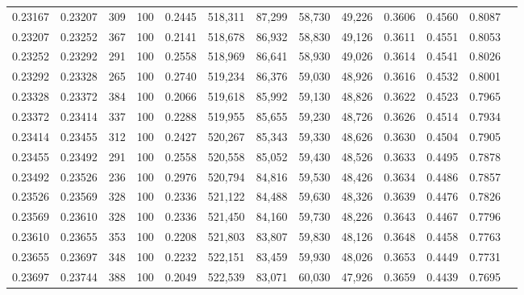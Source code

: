 \begin{tabular}{rrrrrrrrrrrrr}
0.23167 & 0.23207 &   309 & 100 &                                     0.2445 & 518,311 &  87,299 &  58,730 &  49,226 & 0.3606 & 0.4560 & 0.8087 \\
0.23207 & 0.23252 &   367 & 100 &                                     0.2141 & 518,678 &  86,932 &  58,830 &  49,126 & 0.3611 & 0.4551 & 0.8053 \\
0.23252 & 0.23292 &   291 & 100 &                                     0.2558 & 518,969 &  86,641 &  58,930 &  49,026 & 0.3614 & 0.4541 & 0.8026 \\
0.23292 & 0.23328 &   265 & 100 &                                     0.2740 & 519,234 &  86,376 &  59,030 &  48,926 & 0.3616 & 0.4532 & 0.8001 \\
0.23328 & 0.23372 &   384 & 100 &                                     0.2066 & 519,618 &  85,992 &  59,130 &  48,826 & 0.3622 & 0.4523 & 0.7965 \\
0.23372 & 0.23414 &   337 & 100 &                                     0.2288 & 519,955 &  85,655 &  59,230 &  48,726 & 0.3626 & 0.4514 & 0.7934 \\
0.23414 & 0.23455 &   312 & 100 &                                     0.2427 & 520,267 &  85,343 &  59,330 &  48,626 & 0.3630 & 0.4504 & 0.7905 \\
0.23455 & 0.23492 &   291 & 100 &                                     0.2558 & 520,558 &  85,052 &  59,430 &  48,526 & 0.3633 & 0.4495 & 0.7878 \\
0.23492 & 0.23526 &   236 & 100 &                                     0.2976 & 520,794 &  84,816 &  59,530 &  48,426 & 0.3634 & 0.4486 & 0.7857 \\
0.23526 & 0.23569 &   328 & 100 &                                     0.2336 & 521,122 &  84,488 &  59,630 &  48,326 & 0.3639 & 0.4476 & 0.7826 \\
0.23569 & 0.23610 &   328 & 100 &                                     0.2336 & 521,450 &  84,160 &  59,730 &  48,226 & 0.3643 & 0.4467 & 0.7796 \\
0.23610 & 0.23655 &   353 & 100 &                                     0.2208 & 521,803 &  83,807 &  59,830 &  48,126 & 0.3648 & 0.4458 & 0.7763 \\
0.23655 & 0.23697 &   348 & 100 &                                     0.2232 & 522,151 &  83,459 &  59,930 &  48,026 & 0.3653 & 0.4449 & 0.7731 \\
0.23697 & 0.23744 &   388 & 100 &                                     0.2049 & 522,539 &  83,071 &  60,030 &  47,926 & 0.3659 & 0.4439 & 0.7695 \\

\end{tabular}
